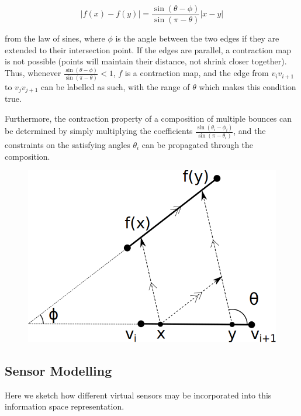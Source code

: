 \documentclass[]{styles/svproc}  %
\begin{document}
\begin{equation*}
|f(x) - f(y)| = \frac{\sin(\theta - \phi)}{\sin(\pi-\theta)} |x-y|
\end{equation*}

from the law of sines, where $\phi$ is the angle between the two edges if they
are extended to their intersection point. If the edges are parallel, a
contraction map is not possible (points will maintain their distance, not shrink
closer together). Thus, whenever $\frac{\sin(\theta - \phi)}{\sin(\pi-\theta)}
< 1$, $f$ is a contraction map, and the edge from $v_i v_{i+1}$ to $v_j
v_{j+1}$ can be labelled as such, with the range of $\theta$ which makes this
condition true.

Furthermore, the contraction property of a composition of multiple bounces can
be determined by simply multiplying the coefficients $\frac{\sin(\theta_i -
\phi_i)}{\sin(\pi-\theta_i)}$, and the constraints on the satisfying angles
$\theta_i$ can be propagated through the composition.

\begin{figure}
    \includegraphics[width=0.8\linewidth]{figures/contraction_map_cond.png}
    \centering
    \caption{\label{fig:cont_map}}
    \centering
\end{figure}

\subsection{Sensor Modelling}

Here we sketch how different virtual sensors may be incorporated into this
information space representation.
\end{document}
